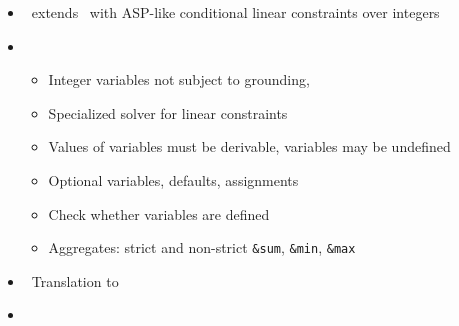 \begin{frame}{\fclingo}
  \begin{itemize}
  \item {} \ extends \clingo\ with ASP-like conditional linear constraints over integers
  \item {} \
    \begin{itemize}
    \item Integer variables not subject to grounding, 
    \item Specialized solver for linear constraints
    \item Values of variables must be derivable, variables may be undefined
    \item Optional variables, defaults, assignments
    \item Check whether variables are defined
    \item Aggregates: strict and non-strict \lstinline{&sum}, \lstinline{&min}, \lstinline{&max}
    \end{itemize}
  \item {} \ Translation to \clingcon
  \item {} \ \cite{cafascwa20a,cafascwa20b}
  \end{itemize}
\end{frame}
%
